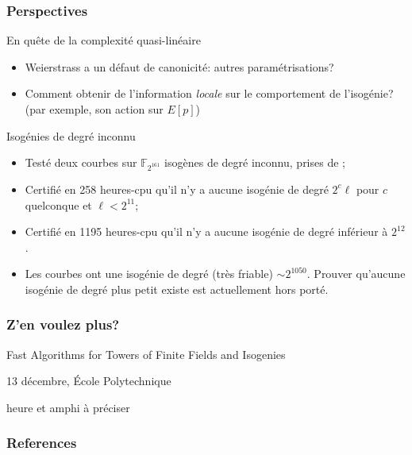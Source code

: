 \documentclass[10pt]{beamer}
\newcommand{\F}{\mathbb{F}}  %
\newcommand{\0}{\mathcal{O}}  %
\begin{document}

\begin{frame}
  \frametitle{Perspectives}
  
  \begin{block}{En quête de la complexité quasi-linéaire}
    \begin{itemize}
    \item Weierstrass a un défaut de canonicité: autres paramétrisations?
    \item Comment obtenir de l'information \emph{locale} sur le
      comportement de l'isogénie? (par exemple, son action sur $E[p]$)
    \end{itemize}
  \end{block}

  \begin{block}{Isogénies de degré inconnu}
    \begin{itemize}
    \item Testé deux courbes sur $\F_{2^{161}}$ isogènes de degré
      inconnu, prises de \cite{teske06};
    \item Certifié en 258 heures-cpu qu'il n'y a aucune isogénie de degré
      $2^c\ell$ pour $c$ quelconque et $\ell<2^{11}$;
    \item Certifié en 1195 heures-cpu qu'il n'y a aucune isogénie de
      degré inférieur à $2^{12}$.
    \item Les courbes ont une isogénie de degré (très friable) $\sim
      2^{1050}$. Prouver qu'aucune isogénie de degré plus petit existe
      est actuellement hors porté.
    \end{itemize}
  \end{block}
\end{frame}


\begin{frame}
  \frametitle{Z'en voulez plus?}
  
  \begin{center}
    \Large Fast Algorithms for Towers of Finite Fields and Isogenies

    \bigskip

    \large 13 décembre, École Polytechnique

    \normalsize heure et amphi à préciser
  \end{center}
\end{frame}


\begin{frame}[allowframebreaks]
  \frametitle{References}


  \beamertemplatebookbibitems
  \printbibliography[filter=books]
  \beamertemplatearticlebibitems
  \printbibliography[filter=articles]
\end{frame}
\end{document}
